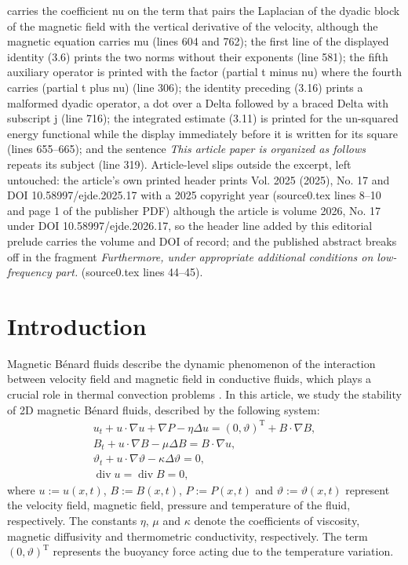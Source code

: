 \documentclass[10pt,a4paper]{amsart}
\numberwithin{equation}{section}
\begin{document}
carries the coefficient nu on the term that pairs the Laplacian of the dyadic block of the magnetic field with the vertical derivative of the velocity, although the magnetic equation carries mu (lines 604 and 762); the first line of the displayed identity (3.6) prints the two norms without their exponents (line 581); the fifth auxiliary operator is printed with the factor (partial t minus nu) where the fourth carries (partial t plus nu) (line 306); the identity preceding (3.16) prints a malformed dyadic operator, a dot over a Delta followed by a braced Delta with subscript j (line 716); the integrated estimate (3.11) is printed for the un-squared energy functional while the display immediately before it is written for its square (lines 655--665); and the sentence \emph{This article paper is organized as follows} repeats its subject (line 319). Article-level slips outside the excerpt, left untouched: the article's own printed header prints Vol. 2025 (2025), No. 17 and DOI 10.58997/ejde.2025.17 with a 2025 copyright year (source0.tex lines 8--10 and page 1 of the publisher PDF) although the article is volume 2026, No. 17 under DOI 10.58997/ejde.2026.17, so the header line added by this editorial prelude carries the volume and DOI of record; and the published abstract breaks off in the fragment \emph{Furthermore, under appropriate additional conditions on low-frequency part.} (source0.tex lines 44--45).
 \section{Introduction}\label{sect1}

Magnetic B\'enard fluids describe the dynamic phenomenon of the interaction between velocity
field and magnetic field in conductive fluids, which plays a crucial role in thermal convection problems \cite{MR3363411,MR44996}.
In this article, we study the stability of 2D magnetic B\'enard fluids, described by the following system:
\begin{equation}\label{1.1}
\begin{gathered}
 u_t+ u\cdot \nabla u+\nabla P-\eta\Delta u= (0,\vartheta)^\mathrm{T}+ B\cdot \nabla B,\\
 B_t+u\cdot\nabla B-\mu\Delta B=B\cdot\nabla u,\\
 \vartheta_t+u\cdot \nabla \vartheta-\kappa\Delta\vartheta=0,\\
 \operatorname{div} u=\operatorname{div} B=0,
\end{gathered}
\end{equation}
where $u:=u(x,t)$, $B:=B(x,t)$, $P:=P(x,t)$ and $\vartheta:=\vartheta(x,t)$ represent the velocity field,
magnetic field, pressure and temperature of the fluid, respectively. The constants $\eta$, $\mu$ and
$\kappa$ denote the coefficients of viscosity, magnetic diffusivity and thermometric conductivity, respectively. The term $(0,\vartheta)^\mathrm{T}$ represents the buoyancy force acting due to the temperature variation.
\end{document}
